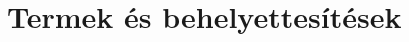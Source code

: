 \begin{code}[hide]
\AgdaSpace{}%
\AgdaSpace{}%
\AgdaSymbol{(}\AgdaSpace{}%
\AgdaSymbol{\{}\AgdaSpace{}%
\AgdaSymbol{=}\AgdaSpace{}%
\AgdaSymbol{\})}\<%
\\
%
\\[\AgdaEmptyExtraSkip]%
\>[0]\AgdaSpace{}%
\AgdaSymbol{:}\AgdaSpace{}%
\AgdaSpace{}%
\AgdaSymbol{\}}\AgdaSpace{}%
\AgdaSpace{}%
\AgdaSpace{}%
\AgdaSpace{}%
\AgdaSpace{}%
\AgdaSpace{}%
\AgdaSpace{}%
\AgdaSymbol{(}\AgdaSpace{}%
\AgdaSymbol{)}\AgdaSpace{}%
\AgdaSymbol{(}\AgdaSpace{}%
\AgdaSymbol{)}\<%
\\
\>[0]\AgdaSpace{}%
\AgdaSpace{}%
\AgdaSymbol{=}\AgdaSpace{}%
\AgdaSpace{}%
\AgdaSpace{}%
\AgdaSpace{}%
\<%
\end{code}

\section{Termek és behelyettesítések}

